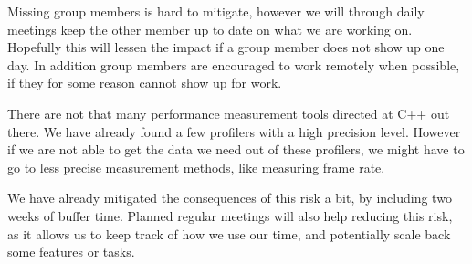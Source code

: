 Missing group members is hard to mitigate, however 
we will through daily meetings keep the other member
up to date on what we are working on. 
Hopefully this will lessen the impact if a group member
does not show up one day.
In addition group members are encouraged to work remotely when possible,
if they for some reason cannot show up for work.

There are not that many performance measurement tools
directed at C++ out there. 
We have already found a few profilers with a high precision level. 
However if we are not able to get the data we need out of these profilers,
we might have to go to less precise measurement methods,
like measuring frame rate.

We have already mitigated the consequences of this risk a bit, by including two weeks of buffer time.
Planned regular meetings will also help reducing this risk, as it allows us to keep 
track of how we use our time, and potentially scale back some features or tasks.